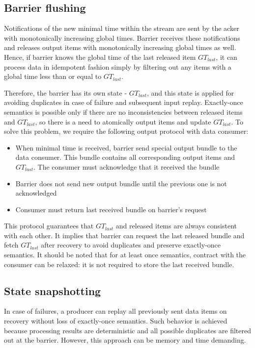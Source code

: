 \subsection{Barrier flushing}
Notifications of the new minimal time within the stream are sent by the acker with monotonically increasing global times. Barrier receives these notifications and releases output items with monotonically increasing global times as well. Hence, if barrier knows the global time of the last released item $GT_{last}$, it can process data in idempotent fashion simply by filtering out any items with a global time less than or equal to $GT_{last}$. 

Therefore, the barrier has its own state - $GT_{last}$, and this state is applied for avoiding duplicates in case of failure and subsequent input replay. Exactly-once semantics is possible only if there are no inconsistencies between released items and $GT_{last}$, so there is a need to atomically output items and update $GT_{last}$. To solve this problem, we require the following output protocol with data consumer:

\begin{itemize}
    \item When minimal time is received, barrier send special output bundle to the data consumer. This bundle contains all corresponding output items and $GT_{last}$. The consumer must acknowledge that it received the bundle
    \item Barrier does not send new output bundle until the previous one is not acknowledged
    \item Consumer must return last received bundle on barrier's request 
\end{itemize}

This protocol guarantees that $GT_{last}$ and released items are always consistent with each other. It implies that barrier can request the last released bundle and fetch $GT_{last}$ after recovery to avoid duplicates and preserve exactly-once semantics. It should be noted that for at least once semantics, contract with the consumer can be relaxed: it is not required to store the last received bundle.

\subsection{State snapshotting}
In case of failures, a producer can replay all previously sent data items on recovery without loss of exactly-once semantics. Such behavior is achieved because processing results are deterministic and all possible duplicates are filtered out at the barrier. However, this approach can be memory and time demanding. 

